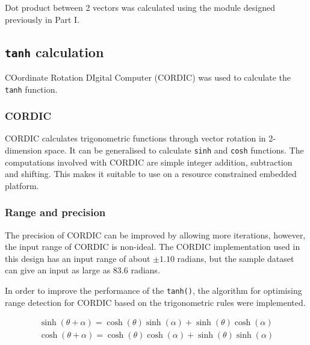 \documentclass[journal]{IEEEtran}
\begin{document}
Dot product between 2 vectors was calculated using the module designed previously in Part I.


\subsection{\texttt{tanh} calculation}

COordinate Rotation DIgital Computer (CORDIC) \cite{volder1959cordic} was used to calculate the \texttt{tanh} function.

\subsubsection{CORDIC}

CORDIC calculates trigonometric functions through vector rotation in 2-dimension space. It can be generalised to calculate \texttt{sinh} and \texttt{cosh} functions. The computations involved with CORDIC are simple integer addition, subtraction and shifting. This makes it suitable to use on a resource constrained embedded platform.

\subsubsection{Range and precision}

The precision of CORDIC can be improved by allowing more iterations, however, the input range of CORDIC is non-ideal. The CORDIC implementation used in this design has an input range of about $\pm 1.10$ radians, but the sample dataset can give an input as large as $83.6$ radians.

In order to improve the performance of the \texttt{tanh()}, the algorithm for optimising range detection for CORDIC based on the trigonometric rules were implemented. 

\begin{align}
\sinh(\theta + \alpha) = \cosh(\theta)\sinh(\alpha) + \sinh(\theta)\cosh(\alpha)
\label{eq:tri}\\
\cosh(\theta + \alpha) = \cosh(\theta)\cosh(\alpha) + \sinh(\theta)\sinh(\alpha)
\end{align}
\end{document}
